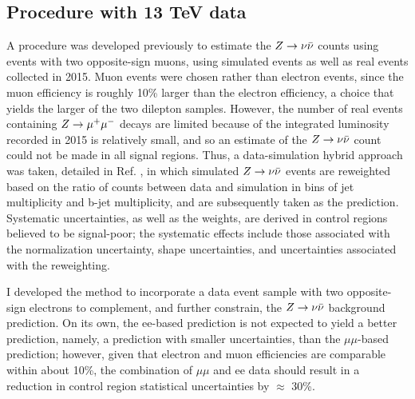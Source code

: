 \subsection{Procedure with 13 TeV data} 
A procedure was developed previously \cite{CMS:2016nhb} to estimate the $Z\rightarrow \nu\bar{\nu}$ counts using events with two opposite-sign muons, using simulated events as well as real events collected in 2015. Muon events were chosen rather than electron events, since the muon efficiency is roughly 10\% larger than the electron efficiency, a choice that yields the larger of the two dilepton samples. However, the number of real events containing $Z\rightarrow \mu^+\mu^-$ decays are limited because of the integrated luminosity recorded in 2015 is relatively small, and so an estimate of the $Z\rightarrow \nu\bar{\nu}$ count could not be made in all signal regions. Thus, a data-simulation hybrid approach was taken, detailed in Ref. \cite{CMS:2016nhb}, in which simulated $Z\rightarrow \nu\bar{\nu}$ events are reweighted based on the ratio of counts between data and simulation in bins of jet multiplicity and b-jet multiplicity, and are subsequently taken as the prediction. Systematic uncertainties, as well as the weights, are derived in control regions believed to be signal-poor; the systematic effects include those associated with the normalization uncertainty, shape uncertainties, and uncertainties associated with the reweighting. 

I developed the method to incorporate a data event sample with two opposite-sign electrons to complement, and further constrain, the $Z\rightarrow \nu\bar{\nu}$ background prediction. On its own, the ee-based prediction is not expected to yield a better prediction, namely, a prediction with smaller uncertainties, than the $\mu\mu$-based prediction; however, given that electron and muon efficiencies are comparable within about 10\%, the combination of $\mu\mu$ and ee data should result in a reduction in control region statistical uncertainties by $\approx$ 30\%. 

